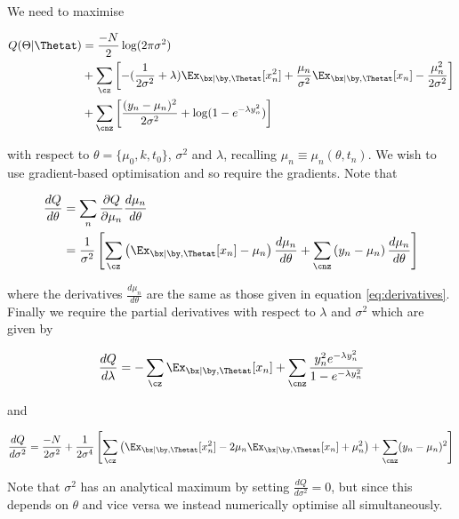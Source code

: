 We need to maximise

\begin{equation}
\begin{aligned}
Q(\Theta | \Thetat) &= \frac{-N}{2} \log(2 \pi \sigma^2) \\
& +
\sum_\cz \left[ -(\frac{1}{2\sigma^2} + \lambda) \Ex_{\bx | \by, \Thetat} [ x_n^2 ] + \frac{\mu_n}{\sigma^2} \Ex_{\bx | \by, \Thetat} [ x_n ] - \frac{\mu_n^2}{2\sigma^2}\right] \\
& +
\sum_\cnz \left[ \frac{(y_n - \mu_n)^2}{2 \sigma^2} + \log(1 - e^{-\lambda y_n^2}) \right]
\end{aligned}
\end{equation}

with respect to $\theta = \{\mu_0, k, t_0\}$, $\sigma^2$ and $\lambda$, recalling $\mu_n \equiv \mu_n(\theta, t_n)$. We wish to use gradient-based optimisation and so require the gradients. Note that

\begin{equation}
\begin{aligned}
\frac{dQ}{d\theta} &= \sum_n \frac{\partial Q}{\partial \mu_n} \frac{d \mu_n}{d \theta} \\
& = \frac{1}{\sigma^2} \left[ \sum_\cz \left(  \Ex_{\bx | \by, \Thetat} [ x_n ] - \mu_n \right) \frac{d \mu_n}{d \theta} +
\sum_\cnz \left( y_n - \mu_n \right) \frac{d \mu_n}{d \theta}\right]
\end{aligned}
\end{equation}

where the derivatives $\frac{d \mu_n}{d \theta}$ are the same as those given in equation \ref{eq:derivatives}. Finally we require the partial derivatives with respect to $\lambda$ and $\sigma^2$ which are given by

\begin{equation}
\frac{dQ}{d \lambda} = -\sum_\cz  \Ex_{\bx | \by, \Thetat} [ x_n ] +
\sum_\cnz \frac{y_n^2 e^{-\lambda y_n^2}}{1 - e^{-\lambda y_n^2}}
\end{equation}

and

\begin{equation}
\frac{dQ}{d\sigma^2} = \frac{-N}{2\sigma^2} +
\frac{1}{2 \sigma^4} \left[ \sum_\cz \left( \Ex_{\bx | \by, \Thetat} [ x_n^2 ] - 2 \mu_n \Ex_{\bx | \by, \Thetat} [ x_n ] + \mu_n^2 \right) +
\sum_\cnz (y_n - \mu_n)^2 \right]
\end{equation}

Note that $\sigma^2$ has an analytical maximum by setting $\frac{dQ}{d\sigma^2} = 0$, but since this depends on $\theta$ and vice versa we instead numerically optimise all simultaneously.
